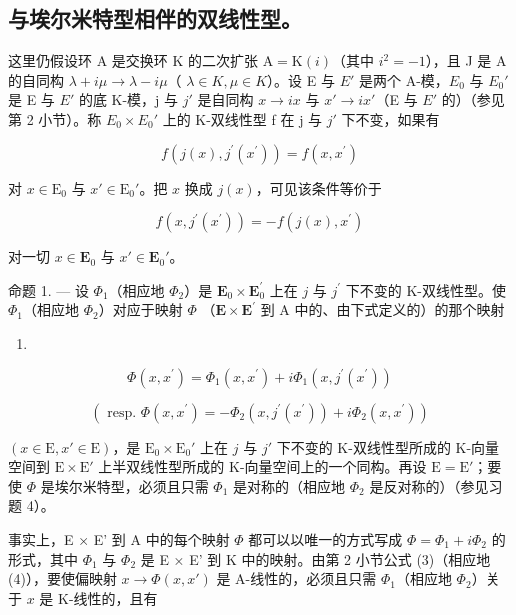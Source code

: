 \subsection{与埃尔米特型相伴的双线性型。}

这里仍假设环 A 是交换环 K 的二次扩张 \(\mathrm{A} = \mathrm{K}(i)\)（其中 \(i^{2} = -1\)），且 J 是 A 的自同构 \(\lambda + i\mu \to \lambda - i\mu\)（ \(\lambda \in K, \mu \in K\)）。设 E 与 \(E'\) 是两个 A-模，\(E_{0}\) 与 \(E_{0}'\) 是 E 与 \(E'\) 的底 K-模，j 与 \(j'\) 是自同构 \(x \to ix\) 与 \(x' \to ix'\)（E 与 \(E'\) 的）（参见第 2 小节）。称 \(E_{0} \times E_{0}'\) 上的 K-双线性型 f 在 j 与 \(j'\) 下不变，如果有

\[
f (j (x), j ^ {\prime} (x ^ {\prime})) = f (x, x ^ {\prime})\tag{5}
\]

对 \(x \in \mathrm{E}_0\) 与 \(x' \in \mathrm{E}_0'\)。把 \(x\) 换成 \(j(x)\)，可见该条件等价于

\[
f (x, j ^ {\prime} (x ^ {\prime})) = - f (j (x), x ^ {\prime})\tag{6}
\]

对一切 \(x \in \mathbf{E}_0\) 与 \(x' \in \mathbf{E}_0'\)。

命题 1. --- 设 \(\Phi_{1}\)（相应地 \(\Phi_{2}\)）是 \(\mathbf{E}_{0} \times \mathbf{E}_{0}^{\prime}\) 上在 \(j\) 与 \(j^{\prime}\) 下不变的 K-双线性型。使 \(\Phi_{1}\)（相应地 \(\Phi_{2}\)）对应于映射 \(\Phi\) （\(\mathbf{E} \times \mathbf{E}^{\prime}\) 到 A 中的、由下式定义的）的那个映射

\begin{enumerate}
\def\labelenumi{(\arabic{enumi})}
\setcounter{enumi}{6}
\tightlist
\item
\end{enumerate}

\[
\Phi (x, x ^ {\prime}) = \Phi_ {1} (x, x ^ {\prime}) + i \Phi_ {1} (x, j ^ {\prime} (x ^ {\prime}))\tag{8}
\]

\[
(\text { resp. } \Phi (x, x ^ {\prime}) = - \Phi_ {2} (x, j ^ {\prime} (x ^ {\prime})) + i \Phi_ {2} (x, x ^ {\prime}))
\]

\((x \in \mathrm{E}, x' \in \mathrm{E})\)，是 \(\mathrm{E}_0 \times \mathrm{E}_0'\) 上在 \(j\) 与 \(j'\) 下不变的 K-双线性型所成的 K-向量空间到 \(\mathrm{E} \times \mathrm{E}'\) 上半双线性型所成的 K-向量空间上的一个同构。再设 \(\mathrm{E} = \mathrm{E}'\)；要使 \(\Phi\) 是埃尔米特型，必须且只需 \(\Phi_1\) 是对称的（相应地 \(\Phi_2\) 是反对称的）（参见习题 4）。

事实上，E × E' 到 A 中的每个映射 \(\Phi\) 都可以以唯一的方式写成 \(\Phi = \Phi_1 + i\Phi_2\) 的形式，其中 \(\Phi_1\) 与 \(\Phi_2\) 是 E × E' 到 K 中的映射。由第 2 小节公式 (3)（相应地 (4)），要使偏映射 \(x \to \Phi(x, x')\) 是 A-线性的，必须且只需 \(\Phi_1\)（相应地 \(\Phi_2\)）关于 \(x\) 是 K-线性的，且有

